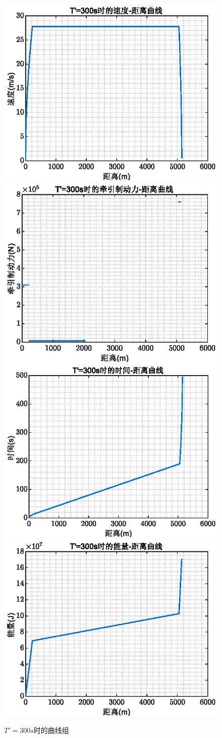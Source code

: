 \documentclass[12pt,a4paper]{nmmcm}
\begin{document}
\begin{figure}[H]
\centering
\includegraphics[width=.49\textwidth,height=0.3\textwidth]{figures/300a.eps}
\includegraphics[width=.49\textwidth,height=0.3\textwidth]{figures/300b.eps}
\includegraphics[width=.49\textwidth,height=0.3\textwidth]{figures/300c.eps}
\includegraphics[width=.49\textwidth,height=0.3\textwidth]{figures/300d.eps}
\caption{\song\wuhao $T'=300s$时的曲线组}
\end{figure}
\end{document}
